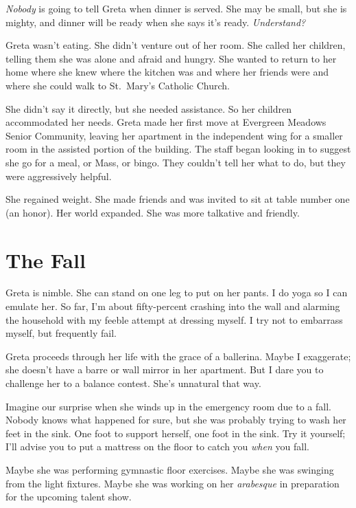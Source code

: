 \documentclass[
  letterpaper,
  DIV=11,
  numbers=noendperiod]{scrreprt}
\begin{document}
\emph{Nobody} is going to tell Greta when dinner is served. She may be
small, but she is mighty, and dinner will be ready when she says it's
ready. \emph{Understand?}

Greta wasn't eating. She didn't venture out of her room. She called her
children, telling them she was alone and afraid and hungry. She wanted
to return to her home where she knew where the kitchen was and where her
friends were and where she could walk to St.~Mary's Catholic Church.

She didn't say it directly, but she needed assistance. So her children
accommodated her needs. Greta made her first move at Evergreen Meadows
Senior Community, leaving her apartment in the independent wing for a
smaller room in the assisted portion of the building. The staff began
looking in to suggest she go for a meal, or Mass, or bingo. They
couldn't tell her what to do, but they were aggressively helpful.

She regained weight. She made friends and was invited to sit at table
number one (an honor). Her world expanded. She was more talkative and
friendly.

\section*{The Fall}\label{the-fall}


Greta is nimble. She can stand on one leg to put on her pants. I do yoga
so I can emulate her. So far, I'm about fifty-percent crashing into the
wall and alarming the household with my feeble attempt at dressing
myself. I try not to embarrass myself, but frequently fail.

Greta proceeds through her life with the grace of a ballerina. Maybe I
exaggerate; she doesn't have a barre or wall mirror in her apartment.
But I dare you to challenge her to a balance contest. She's unnatural
that way.

Imagine our surprise when she winds up in the emergency room due to a
fall. Nobody knows what happened for sure, but she was probably trying
to wash her feet in the sink. One foot to support herself, one foot in
the sink. Try it yourself; I'll advise you to put a mattress on the
floor to catch you \emph{when} you fall.

Maybe she was performing gymnastic floor exercises. Maybe she was
swinging from the light fixtures. Maybe she was working on her
\emph{arabesque} in preparation for the upcoming talent show.
\end{document}
